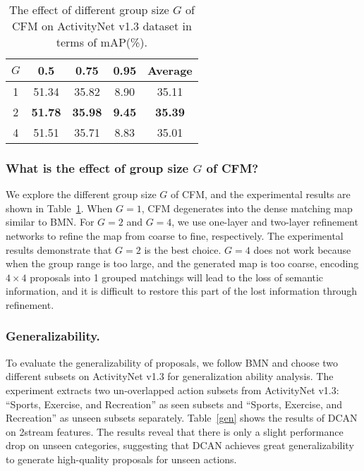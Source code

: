 \documentclass[letterpaper]{article} \usepackage{aaai22}  \usepackage{times}  \usepackage{helvet}  \usepackage{courier}  \usepackage[hyphens]{url}  \usepackage{graphicx} \urlstyle{rm} \def\UrlFont{\rm}  \usepackage{natbib}  \usepackage{caption} \DeclareCaptionStyle{ruled}{labelfont=normalfont,labelsep=colon,strut=off} \frenchspacing  \setlength{\pdfpagewidth}{8.5in}  \setlength{\pdfpageheight}{11in}  \usepackage{algorithm}
\begin{document}
\begin{table}[!t]
\centering
\caption{The effect of different group size $G$ of CFM on ActivityNet v1.3 dataset in terms of mAP(\%).}
\label{table:ablation-sparse-rate-anet}
\begin{tabular}{ccccc}
\toprule
$G$ & 0.5 & 0.75 & 0.95 & Average \\
\midrule
1 & 51.34 & 35.82 & 8.90 & 35.11 \\
2 & \textbf{51.78} & \textbf{35.98} & \textbf{9.45} & \textbf{35.39} \\
4 & 51.51 & 35.71 & 8.83 & 35.01 \\
\bottomrule
\end{tabular}
\end{table}








\subsubsection{What is the effect of group size $G$ of CFM?}
We explore the different group size $G$ of CFM, and the experimental results are shown in Table~\ref{table:ablation-sparse-rate-anet}.
When $G=1$, CFM degenerates into the dense matching map similar to BMN.
For $G=2$ and $G=4$, we use one-layer and two-layer refinement networks to refine the map from coarse to fine, respectively.
The experimental results demonstrate that $G=2$ is the best choice.
$G=4$ does not work because when the group range is too large, and the generated map is too coarse, encoding $4 \times 4$ proposals into 1 grouped matchings will lead to the loss of semantic information, and it is difficult to restore this part of the lost information through refinement.



\subsubsection{Generalizability.}


To evaluate the generalizability of proposals, we follow BMN and choose two different subsets on ActivityNet v1.3 for generalization ability analysis. The experiment extracts two un-overlapped action subsets from ActivityNet v1.3: ``Sports, Exercise, and Recreation'' as seen subsets and ``Sports, Exercise, and Recreation'' as unseen subsets separately. Table~\ref{gen} shows the results of DCAN on 2stream features. The results reveal that there is only a slight performance drop on unseen categories, suggesting that DCAN achieves great generalizability to generate high-quality proposals for unseen actions. 
\end{document}
